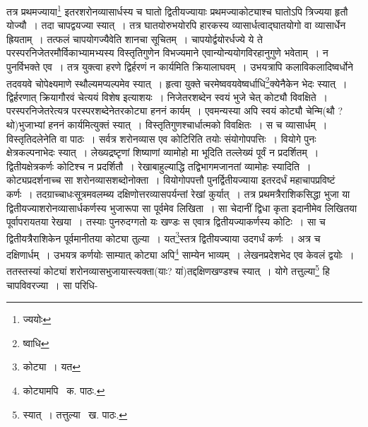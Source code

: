 \documentclass[11pt, openany]{book}
\begin{document}
\noindent तत्र प्रथमज्याया\renewcommand{\thefootnote}{१}\footnote{ज्ययोः} इतरशरोनव्यासार्धस्य च घातो द्वितीयज्यायाः प्रथमज्याकोट्याश्च घातोऽपि त्रिज्यया हृतौ योज्यौ~। तदा चापद्वयज्या स्यात्~। तत्र घातयोरुभयोरपि हारकस्य व्यासार्धत्वाद्घातयोगो वा व्यासार्धेन ह्रियताम्~। तत्फलं चापयोगज्यैवेति शानचा सूचितम्~। चापयोर्द्वयोरर्धज्ये ये ते परस्परनिजेतरमौर्विकाभ्यामभ्यस्य विस्तृतिगुणेन विभज्यमाने एवान्योन्ययोगविरहानुगुणे भवेताम्~। न पुनर्विभक्ते एव~। तत्र युक्त्वा हरणे द्विर्हरणं न कार्यमिति क्रियालाघवम्~। उभयत्रापि कलाविकलादिष्वर्धोने तदवयवे चोपेक्ष्यमाणे स्थौल्यमप्यल्पमेव स्यात्~। हृत्वा युक्ते
चरमेष्ववयवेष्वर्धाधि\renewcommand{\thefootnote}{२}\footnote{ष्वाधि}क्येनैकेन भेदः स्यात्~। द्विर्हरणात् क्रियागौरवं चेत्ययं विशेष इत्याशयः~। निजेतरशब्देन स्वयं भुजे चेत् कोट्यौ विवक्षिते~। {\qt परस्परनिजेतरे}त्यत्र परस्परशब्देनेतरकोट्या हननं कार्यम्~। एवमन्यस्या अपि स्वयं कोट्यौ चेन्मि(थौ ? थो)भुजाभ्यां हननं कार्यमित्युक्तं स्यात्~। विस्तृतिगुणश्चार्धात्मको विवक्षितः~। स च व्यासार्धम्~। विस्तृतिदलेनेति वा पाठः~। सर्वत्र शरोनव्यास एव कोटिरिति तयोः संयोगोपपत्तिः~। वियोगे पुनः क्षेत्रकल्पनाभेदः स्यात्~। लेख्यद्रष्टृणां शिष्याणां व्यामोहो मा भूदिति तल्लेख्यं पूर्वं न प्रदर्शितम्~। द्वितीयक्षेत्रकर्णः कोटिश्च न प्रदर्शितौ~। रेखाबाहुल्याद्धि तद्विभागमजानतां व्यामोहः स्यादिति~। कोट्यप्रदर्शनाच्च सा शरोनव्यासशब्दोनोक्ता~। वियोगोपपत्तौ पुनर्द्वितीयज्याया इतरदर्धं महाचापप्रविष्टं कर्णः~। तदग्राच्चाधःसूत्रमवलम्ब्य दक्षिणोत्तरव्यासपर्यन्तां रेखां कुर्यात्~। तत्र प्रथमत्रैराशिकसिद्धा भुजा या द्वितीयज्याशरोनव्यासार्धकर्णस्य भुजारूपा सा पूर्वमेव लिखिता~। सा चेदानीं द्विधा कृता इदानीमेव लिखितया पूर्वापरायतया रेखया~। तस्याः पुनरुदग्गतो यः खण्डः स एवात्र द्वितीयज्याकर्णस्य कोटिः~। सा च द्वितीयत्रैराशिकेन पूर्वमानीतया कोट्या तुल्या~। यत\renewcommand{\thefootnote}{३}\footnote{कोट्या~। यत}स्तत्र द्वितीयज्याया उदगर्धं कर्णः~। अत्र च दक्षिणार्धम्~। उभयत्र कर्णयोः साम्यात् कोट्या अपि\renewcommand{\thefootnote}{४}\footnote{कोट्यामपि \textendash\ क. पाठः.} साम्येन भाव्यम्~। लेखनप्रदेशभेद एव केवलं द्वयोः~। ततस्तस्यां कोट्यां शरोनव्यासभुजायास्त्यक्ता(याः? यां)तद्दक्षिणखण्डश्च स्यात्~। योगे तत्तुल्या\renewcommand{\thefootnote}{५}\footnote{स्यात्~। तत्तुल्या \textendash\ ख. पाठः.} हि चापविवरज्या~। सा परिधि-

\newpage
\end{document}
